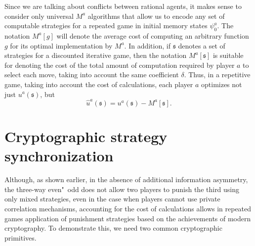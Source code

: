 Since we are talking about conflicts between rational agents, it makes sense to consider only universal $M^a$ algorithms that allow us to encode any set of computable strategies for a repeated game in initial memory states $\psi^a_0$. The notation $M^a[g]$ will denote the average cost of computing an arbitrary function $g$ for its optimal implementation by $M^a$. In addition, if $\mathfrak{s}$ denotes a set of strategies for a discounted iterative game, then the notation $M^a[\mathfrak{s}]$ is suitable for denoting the cost of the total amount of computation required by player $a$ to select each move, taking into account the same coefficient $\delta$. Thus, in a repetitive game, taking into account the cost of calculations, each player $a$ optimizes not just $u^a(\mathfrak{s})$, but %
\begin{equation*}
	\hat{u}^a(\mathfrak{s}) = u^a(\mathfrak{s}) - M^a[\mathfrak{s}].	
\end{equation*}

\section{Cryptographic strategy synchronization}\label{sec:ch3/sect4}

Although, as shown earlier, in the absence of additional information asymmetry, the three-way even"~odd does not allow two players to punish the third using only mixed strategies, even in the case when players cannot use private correlation mechanisms, accounting for the cost of calculations allows in repeated games application of punishment strategies based on the achievements of modern cryptography. To demonstrate this, we need two common cryptographic primitives. %

